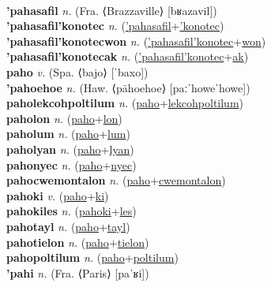  \label{'pahamatilip} \\
\textbf{'pahasafil} \textit{n.} (Fra. ⟨Brazzaville⟩ [bʁazavil])
 \label{'pahasafil} \\
\textbf{'pahasafil'konotec} \textit{n.} (\hyperref['pahasafil]{'pahasafil}+\hyperref['konotec]{'konotec})
 \label{'pahasafil'konotec} \\
\textbf{'pahasafil'konotecwon} \textit{n.} (\hyperref['pahasafil'konotec]{'pahasafil'konotec}+\hyperref[won]{won})
 \label{'pahasafil'konotecwon} \\
\textbf{'pahasafil'konotecak} \textit{n.} (\hyperref['pahasafil'konotec]{'pahasafil'konotec}+\hyperref[ak]{ak})
 \label{'pahasafil'konotecak} \\
\textbf{paho} \textit{v.} (Spa. ⟨bajo⟩ [ˈbaxo])
 \label{paho} \\
\textbf{'pahoehoe} \textit{n.} (Haw. ⟨pāhoehoe⟩ [paːˈhoweˈhowe])
 \label{'pahoehoe} \\
\textbf{paholekcohpoltilum} \textit{n.} (\hyperref[paho]{paho}+\hyperref[lekcohpoltilum]{lekcohpoltilum})
 \label{paholekcohpoltilum} \\
\textbf{paholon} \textit{n.} (\hyperref[paho]{paho}+\hyperref[lon]{lon})
 \label{paholon} \\
\textbf{paholum} \textit{n.} (\hyperref[paho]{paho}+\hyperref[lum]{lum})
 \label{paholum} \\
\textbf{paholyan} \textit{n.} (\hyperref[paho]{paho}+\hyperref[lyan]{lyan})
 \label{paholyan} \\
\textbf{pahonyec} \textit{n.} (\hyperref[paho]{paho}+\hyperref[nyec]{nyec})
 \label{pahonyec} \\
\textbf{pahocwemontalon} \textit{n.} (\hyperref[paho]{paho}+\hyperref[cwemontalon]{cwemontalon})
 \label{pahocwemontalon} \\
\textbf{pahoki} \textit{v.} (\hyperref[paho]{paho}+\hyperref[ki]{ki})
 \label{pahoki} \\
\textbf{pahokiles} \textit{n.} (\hyperref[pahoki]{pahoki}+\hyperref[les]{les})
 \label{pahokiles} \\
\textbf{pahotayl} \textit{n.} (\hyperref[paho]{paho}+\hyperref[tayl]{tayl})
 \label{pahotayl} \\
\textbf{pahotielon} \textit{n.} (\hyperref[paho]{paho}+\hyperref[tielon]{tielon})
 \label{pahotielon} \\
\textbf{pahopoltilum} \textit{n.} (\hyperref[paho]{paho}+\hyperref[poltilum]{poltilum})
 \label{pahopoltilum} \\
\textbf{'pahi} \textit{n.} (Fra. ⟨Paris⟩ [paˈʁi])
